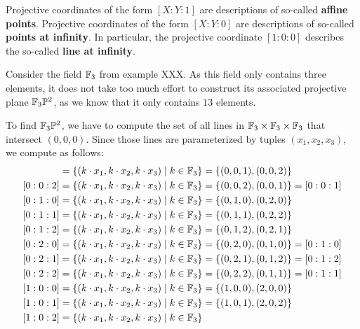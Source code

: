 \begin{notation}
Projective coordinates of the form $[X:Y:1]$ are descriptions of so-called \textbf{affine points}.  Projective coordinates of the form $[X:Y:0]$ are descriptions of so-called \textbf{points at infinity}. In particular, the projective coordinate $[1:0:0]$ describes the so-called \textbf{line at infinity}.
\end{notation}
\begin{example} Consider the field $\mathbb{F}_3$ from example XXX. As this field only contains three elements, it does not take too much effort to construct its associated projective plane $\mathbb{F}_3\mathbb{P}^2$, as we know that it only contains $13$ elements.

To find $\mathbb{F}_3\mathbb{P}^2$, we have to compute the set of all lines in $\mathbb{F}_3\times \mathbb{F}_3\times \mathbb{F}_3$ that intersect $(0,0,0)$. Since those lines are parameterized by tuples $(x_1,x_2,x_3)$, we compute as follows:
\begin{align*}
[0:0:1] &= \{(k\cdot x_1,k\cdot x_2, k\cdot x_3)\;|\; k\in\F_3\}
          = \{(0,0,1), (0,0,2)\}\\
[0:0:2] &= \{(k\cdot x_1,k\cdot x_2, k\cdot x_3)\;|\; k\in\F_3\}
          = \{(0,0,2), (0,0,1)\}
          = [0:0:1]\\
[0:1:0] &= \{(k\cdot x_1,k\cdot x_2, k\cdot x_3)\;|\; k\in\F_3\}
          = \{(0,1,0), (0,2,0)\}\\
[0:1:1] &= \{(k\cdot x_1,k\cdot x_2, k\cdot x_3)\;|\; k\in\F_3\}
          = \{(0,1,1), (0,2,2)\}\\
[0:1:2] &= \{(k\cdot x_1,k\cdot x_2, k\cdot x_3)\;|\; k\in\F_3\}
          = \{(0,1,2), (0,2,1)\}\\
[0:2:0] &= \{(k\cdot x_1,k\cdot x_2, k\cdot x_3)\;|\; k\in\F_3\}
          = \{(0,2,0), (0,1,0)\}
          = [0:1:0]\\
[0:2:1] &= \{(k\cdot x_1,k\cdot x_2, k\cdot x_3)\;|\; k\in\F_3\}
          = \{(0,2,1), (0,1,2)\}
          = [0:1:2]\\
[0:2:2] &= \{(k\cdot x_1,k\cdot x_2, k\cdot x_3)\;|\; k\in\F_3\}
          = \{(0,2,2), (0,1,1)\}
          = [0:1:1]\\
[1:0:0] &= \{(k\cdot x_1,k\cdot x_2, k\cdot x_3)\;|\; k\in\F_3\}
          = \{(1,0,0), (2,0,0)\}\\
[1:0:1] &= \{(k\cdot x_1,k\cdot x_2, k\cdot x_3)\;|\; k\in\F_3\}
          = \{(1,0,1), (2,0,2)\}\\
[1:0:2] &= \{(k\cdot x_1,k\cdot x_2, k\cdot x_3)\;|\; k\in\F_3\}

\end{align*}
\end{example}
